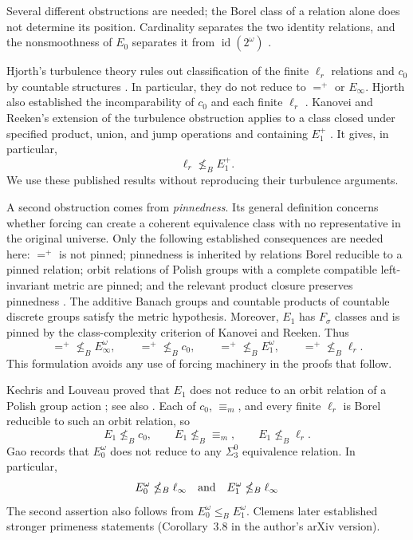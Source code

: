 \documentclass[11pt]{article}
\numberwithin{equation}{section}
\theoremstyle{definition}
\begin{document}
Several different obstructions are needed; the Borel class of a relation
alone does not determine its position.  Cardinality separates the two
identity relations, and the nonsmoothness of $E_0$ separates it from
$\operatorname{id}(2^\omega)$ \cite{Gao}.

Hjorth's turbulence theory rules out classification of the finite
$\ell_r$ relations and $c_0$ by countable structures
\cite{HjorthBook,Gao}.  In particular, they do not reduce to ${=^+}$ or
$E_\infty$.  Hjorth also established the incomparability of $c_0$ and
each finite $\ell_r$ \cite{HjorthBanach}.  Kanovei and Reeken's
extension of the turbulence obstruction applies to a class closed under
specified product, union, and jump operations and containing $E_1^+$
\cite{KR}.  It gives, in particular,
\[
 \ell_r\nleq_B E_1^+.
\]
We use these published results without reproducing their turbulence
arguments.

A second obstruction comes from \emph{pinnedness}.  Its general
definition concerns whether forcing can create a coherent equivalence
class with no representative in the original universe.  Only the
following established consequences are needed here: ${=^+}$ is not
pinned; pinnedness is inherited by relations Borel reducible to a pinned
relation; orbit relations of Polish groups with a complete compatible
left-invariant metric are pinned; and the relevant product closure
preserves pinnedness \cite{KR,HjorthOrbit}.  The additive Banach groups and
countable products of countable discrete groups satisfy the metric
hypothesis.  Moreover, $E_1$ has $F_\sigma$ classes and is pinned by the
class-complexity criterion of Kanovei and Reeken.  Thus
\begin{equation}\label{eq:pinned-obstructions}
 {=^+}\nleq_B E_\infty^\omega,
 \qquad {=^+}\nleq_B c_0,
 \qquad {=^+}\nleq_B E_1^\omega,
 \qquad {=^+}\nleq_B\ell_r.
\end{equation}
This formulation avoids any use of forcing machinery in the proofs
that follow.

Kechris and Louveau proved that $E_1$ does not reduce to an orbit
relation of a Polish group action \cite[Theorem~4.2]{KL}; see also
\cite[Theorem~10.6.1]{Gao}. Each of $c_0$, $\equiv_m$, and every finite $\ell_r$
is Borel reducible to such an orbit relation, so
\[
 E_1\nleq_B c_0,
 \qquad E_1\nleq_B{\equiv_m},
 \qquad E_1\nleq_B\ell_r.
\]
Gao \cite[Theorem~8.5.2]{Gao} records that $E_0^\omega$
does not reduce to any $\Sigma^0_3$ equivalence relation.
In particular,
\[
 E_0^\omega\nleq_B\ell_\infty
 \quad\hbox{and}\quad
 E_1^\omega\nleq_B\ell_\infty
\]
The second assertion also follows from $E_0^\omega\le_B E_1^\omega$.
Clemens later established stronger primeness statements
\cite{Clemens} (Corollary~3.8 in the author's arXiv version).
\end{document}
